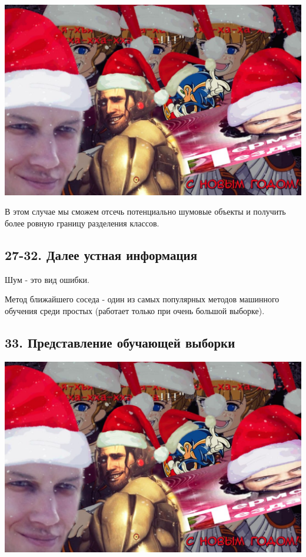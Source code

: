 \includegraphics[scale=0.3]{figures/samplefigure.jpg}

В этом случае мы сможем отсечь потенциально шумовые объекты и получить более
ровную границу разделения классов.

\subsection{27-32. Далее устная информация}

Шум - это вид ошибки.

Метод ближайшего соседа - один из самых популярных методов машинного
обучения среди простых (работает только при очень большой выборке).

\subsection{33. Представление обучающей выборки}

\includegraphics[scale=0.3]{figures/samplefigure.jpg}

